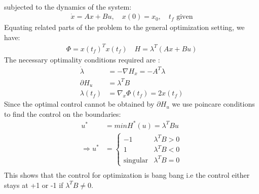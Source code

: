 \begin{enumerate}
\begin{align*}
      \end{align*}
      subjected to the dynamics of the system:
	\begin{align*}
	\dot x = Ax + Bu, \quad x(0) = x_0, \quad t_f \mbox{ given}
	\end{align*}
    Equating related parts of the problem to the general optimization setting, we have:
      \begin{align*}
       \Phi = x(t_f)^T x(t_f) \quad H = \lambda^T (Ax+Bu) 
      \end{align*}
      The necessary optimality conditions required are :
      \begin{align*}
       \dot \lambda &= - \nabla H_x = - A^T \lambda \\
       \partial H_u &= \lambda^T B\\
       \lambda(t_f) &= \nabla_x \Phi(t_f) = 2 x(t_f)
      \end{align*}
      Since the optimal control cannot be obtained by $\partial H_u$ we use poincare conditions to find the control on the
boundaries:
     \begin{align*}
      u^* &= min H^* (u) = \lambda^T B u\\
      \Rightarrow u^* &= \begin{cases}
                         -1 & \lambda^T B > 0\\
                         1 & \lambda^T B < 0\\
                         \mbox{singular} & \lambda^T B = 0
                        \end{cases}\\
     \end{align*}
     This shows that the control for optimization is bang bang i.e the control either stays at +1 or -1 if $\lambda^T B \neq0$.
     

\end{enumerate}
